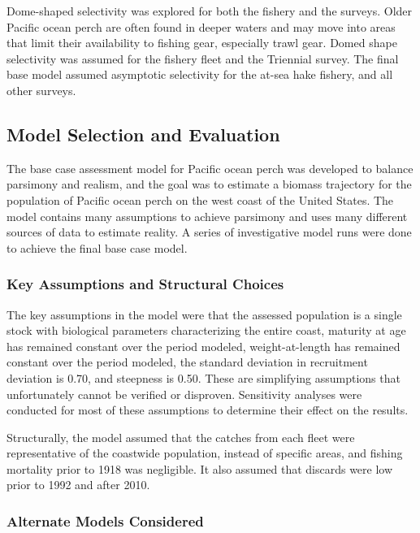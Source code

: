 \documentclass[12pt,]{article}
\begin{document}
Dome-shaped selectivity was explored for both the fishery and the
surveys. Older Pacific ocean perch are often found in deeper waters and
may move into areas that limit their availability to fishing gear,
especially trawl gear. Domed shape selectivity was assumed for the
fishery fleet and the Triennial survey. The final base model assumed
asymptotic selectivity for the at-sea hake fishery, and all other
surveys.

\subsection{Model Selection and
Evaluation}\label{model-selection-and-evaluation}

The base case assessment model for Pacific ocean perch was developed to
balance parsimony and realism, and the goal was to estimate a biomass
trajectory for the population of Pacific ocean perch on the west coast
of the United States. The model contains many assumptions to achieve
parsimony and uses many different sources of data to estimate reality. A
series of investigative model runs were done to achieve the final base
case model.

\subsubsection{Key Assumptions and Structural
Choices}\label{key-assumptions-and-structural-choices}

The key assumptions in the model were that the assessed population is a
single stock with biological parameters characterizing the entire coast,
maturity at age has remained constant over the period modeled,
weight-at-length has remained constant over the period modeled, the
standard deviation in recruitment deviation is 0.70, and steepness is
0.50. These are simplifying assumptions that unfortunately cannot be
verified or disproven. Sensitivity analyses were conducted for most of
these assumptions to determine their effect on the results.

Structurally, the model assumed that the catches from each fleet were
representative of the coastwide population, instead of specific areas,
and fishing mortality prior to 1918 was negligible. It also assumed that
discards were low prior to 1992 and after 2010.

\subsubsection{Alternate Models
Considered}\label{alternate-models-considered}
\end{document}

